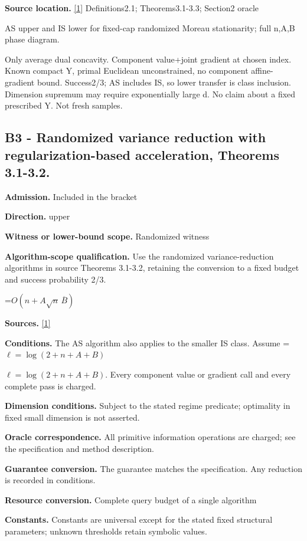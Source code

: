 \documentclass[10pt,a4paper]{article}
\newcommand{\AtlasMath}[1]{\par\begingroup\centering\setbox0=\hbox{$\displaystyle #1$}\ifdim\wd0>1.4\linewidth\typeout{ATLAS WIDE FORMULA: \the\wd0}\fi\ifdim\wd0>\linewidth\resizebox{\linewidth}{!}{\box0}\else\box0\fi\par\endgroup}
\newcommand{\AtlasInlineMath}[1]{\begingroup\setbox0=\hbox{$#1$}\ifdim\wd0>.4\linewidth\endgroup\AtlasMath{#1}\else\endgroup$#1$\fi}
\begin{document}
\textbf{Source location.} \href{https://arxiv.org/pdf/2610.16991v2}{[1]} Definitions2.1; Theorems3.1-3.3; Section2 oracle

AS upper and IS lower for fixed-cap randomized Moreau stationarity; full n,A,B phase diagram.

Only average dual concavity. Component value+joint gradient at chosen index. Known compact Y, primal Euclidean unconstrained, no component affine-gradient bound. Success2/3; AS includes IS, so lower transfer is class inclusion. Dimension supremum may require exponentially large d. No claim about a fixed prescribed Y. Not fresh samples.

\subsection{B3 - Randomized variance reduction with regularization-based acceleration, Theorems 3.1-3.2.}
\textbf{Admission.} Included in the bracket

\textbf{Direction.} upper

\textbf{Witness or lower-bound scope.} Randomized witness

\textbf{Algorithm-scope qualification.} Use the randomized variance-reduction algorithms in source Theorems 3.1-3.2, retaining the conversion to a fixed budget and success probability 2/3.

\AtlasMath{O(n+A\sqrt n\,\overline B)}
\textbf{Sources.} \href{https://arxiv.org/pdf/2610.16991v2}{[1]}

\textbf{Conditions.} The AS algorithm also applies to the smaller IS class. Assume \AtlasInlineMath{\ell=\log(2+n+A+B)}. Every component value or gradient call and every complete pass is charged.

\textbf{Dimension conditions.} Subject to the stated regime predicate; optimality in fixed small dimension is not asserted.

\textbf{Oracle correspondence.} All primitive information operations are charged; see the specification and method description.

\textbf{Guarantee conversion.} The guarantee matches the specification. Any reduction is recorded in conditions.

\textbf{Resource conversion.} Complete query budget of a single algorithm

\textbf{Constants.} Constants are universal except for the stated fixed structural parameters; unknown thresholds retain symbolic values.
\end{document}
